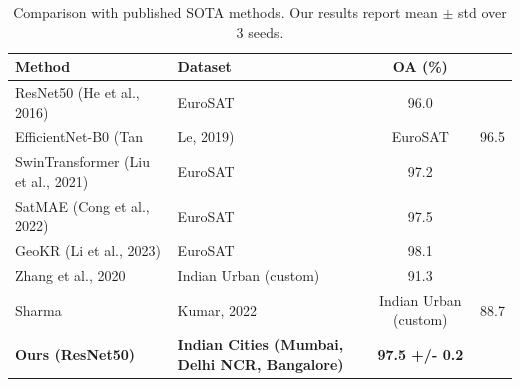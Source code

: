 \begin{table}[h]
\centering
\caption{Comparison with published SOTA methods. Our results report mean $\pm$ std over 3 seeds.}
\label{tab:sota}
\begin{tabular}{llc}
\toprule
Method & Dataset & OA (\%) \\
\midrule
ResNet50 (He et al., 2016) & EuroSAT & 96.0 \\
EfficientNet-B0 (Tan & Le, 2019) & EuroSAT & 96.5 \\
SwinTransformer (Liu et al., 2021) & EuroSAT & 97.2 \\
SatMAE (Cong et al., 2022) & EuroSAT & 97.5 \\
GeoKR (Li et al., 2023) & EuroSAT & 98.1 \\
Zhang et al., 2020 & Indian Urban (custom) & 91.3 \\
Sharma & Kumar, 2022 & Indian Urban (custom) & 88.7 \\
\midrule
\textbf{Ours (ResNet50)} & \textbf{Indian Cities (Mumbai, Delhi NCR, Bangalore)} & \textbf{97.5 +/- 0.2} \\
\bottomrule
\end{tabular}
\end{table}